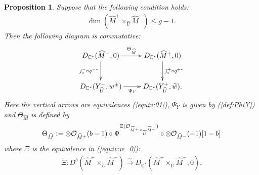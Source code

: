 \documentclass[11pt]{amsart}
\theoremstyle{plain}
\newtheorem{prop}[thm]{Proposition}
\newcommand{\oO}{\mathcal{O}}
\begin{document}
\begin{prop}\label{prop:commute2}
Suppose that 
the following condition holds: 
\begin{align}\label{dim:fprod}
\dim (\widehat{M}^{+} \times_{\widehat{U}} \widehat{M}^{-}) \le g-1.
\end{align}
Then the following diagram is commutative: 
\begin{align}\notag
\xymatrix{
D_{\mathbb{C}^{\ast}}(\widehat{M}^{-}, 0)  \ar[r]^-{\Theta_{\widehat{M}}}
\ar[d]_-{j^{-}_{\ast}\circ q^{-\ast}}&
D_{\mathbb{C}^{\ast}}(\widehat{M}^{+}, 0) 
\ar[d]^-{j^{+}_{\ast}\circ q^{+\ast}} \\
D_{\mathbb{C}^{\ast}}(Y_{\widehat{U}}^{-}, w^{\pm}) \ar[r]_-{\Psi_Y} & 
D_{\mathbb{C}^{\ast}}(Y_{\widehat{U}}^+, \widetilde{w}) .
}
\end{align}
Here the vertical arrows are equivalences (\ref{equiv:01}), 
$\Psi_Y$ is given by (\ref{def:PhiY}) and 
$\Theta_{\widehat{M}}$ is defined by
\begin{align*}
\Theta_{\widehat{M}} \cneq 
\otimes \oO_{\widehat{M}^{+}}(b-1) \circ 
\Psi^{\Xi(\oO_{\widehat{M}^{+} \times_{\widehat{U}} \widehat{M}^{-}})}
\circ \otimes \oO_{\widehat{M}^{-}}(-1)[1-b]
\end{align*}
where $\Xi$ is the equivalence in (\ref{equiv:w=0}): 
\begin{align*}
\Xi \colon D^b(\widehat{M}^+ \times_{\widehat{U}} \widehat{M}^-)
\stackrel{\sim}{\to} D_{\mathbb{C}^{\ast}}(\widehat{M}^+ \times_{\widehat{U}} \widehat{M}^-, 0).
\end{align*}
\end{prop}
\end{document}
